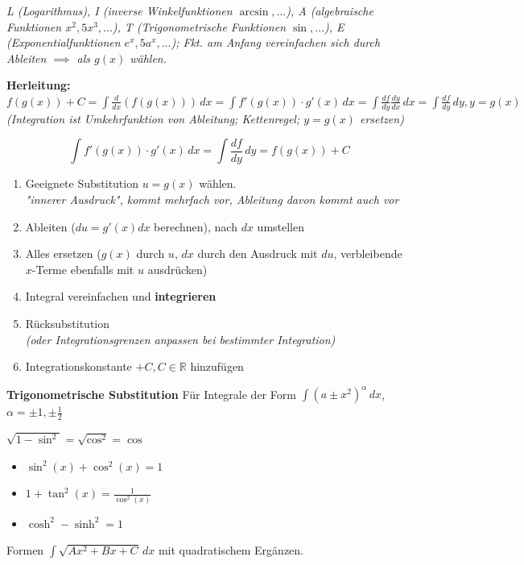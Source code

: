 \textit{L (Logarithmus), I (inverse Winkelfunktionen $\arcsin, ...$), A (algebraische Funktionen $x^2, 5x^3, ...$), T (Trigonometrische Funktionen $\sin, \dots$), E (Exponentialfunktionen $e^x, 5a^x, \dots$); Fkt. am Anfang vereinfachen sich durch Ableiten $\implies$ als $g(x)$ wählen.}


\textbf{Herleitung:}
$f(g(x))+C = \int \frac{d}{dx} (f(g(x)))\,dx = \int f'(g(x)) \cdot g'(x)\,dx = \int \frac{df}{dy} \frac{dy}{dx}\,dx = \int \frac{df}{dy}\, dy, y=g(x)$
\textit{(Integration ist Umkehrfunktion von Ableitung; Kettenregel; $y=g(x)$ ersetzen)}

$$\int f'(g(x))\cdot g'(x)\,dx = \int \frac{df}{dy}\, dy = f(g(x))+C$$

\begin{enumerate}
    \item Geeignete Substitution $u=g(x)$ wählen.\\
    \textit{"innerer Ausdruck", kommt mehrfach vor, Ableitung davon kommt auch vor}
    \item Ableiten ($du = g'(x) dx$ berechnen), nach $dx$ umstellen
    \item Alles ersetzen ($g(x)$ durch $u$, $dx$ durch den Ausdruck mit $du$, verbleibende $x$-Terme ebenfalls mit $u$ ausdrücken)
    \item Integral vereinfachen und \textbf{integrieren}
    \item Rücksubstitution\\
     \textit{(oder Integrationsgrenzen anpassen bei bestimmter Integration)}
    \item Integrationskonstante $+C, C \in \mathbb{R}$ hinzufügen
\end{enumerate}

\textbf{Trigonometrische Substitution}
Für Integrale der Form $\int (a \pm x^2)^\alpha \, dx$, $\alpha = \pm 1, \pm \frac{1}{2}$

$\sqrt{1-\sin^2}=\sqrt{\cos^2} = \cos$
\begin{itemize}
    \item $\sin^2(x)+\cos^2(x)=1$
    \item $1+\tan^2(x)=\frac{1}{\cos^2(x)}$
    \item $\cosh^2 - \sinh^2=1$
\end{itemize}



Formen $\int \sqrt{Ax^2 + B x + C} \, dx$ mit quadratischem Ergänzen.

